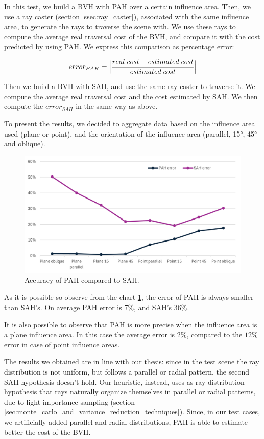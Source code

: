 \documentclass{PoliMi_MasterThesis}
\begin{document}
In this test, we build a BVH with PAH over a certain influence area. Then, we use a ray caster (section \ref{ssec:ray_caster}), associated with the same influence area, to generate the rays to traverse the scene with. We use these rays to compute the average real traversal cost of the BVH, and compare it with the cost predicted by using PAH. We express this comparison as percentage error:

$$error_{PAH} = \Big{|}\frac{real \; cost - estimated \; cost}{estimated \; cost}\Big{|}$$

Then we build a BVH with SAH, and use the same ray caster to traverse it. We compute the average real traversal cost and the cost estimated by SAH. We then compute the $error_{SAH}$ in the same way as above.

To present the results, we decided to aggregate data based on the influence area used (plane or point), and the orientation of the influence area (parallel, 15°, 45° and oblique).

\begin{figure}[H]
	\centering
	\includegraphics[width=\textwidth]{Images/pah_accuracy_chart.png}
	\caption{Accuracy of PAH compared to SAH.} 
	\label{fig:pah_accuracy_chart}
\end{figure}

As it is possible so observe from the chart \ref{fig:pah_accuracy_chart}, the error of PAH is always smaller than SAH's. On average PAH error is $7\%$, and SAH's $36\%$.

It is also possible to observe that PAH is more precise when the influence area is a plane influence area. In this case the average error is $2\%$, compared to the $12\%$ error in case of point influence areas.

The results we obtained are in line with our thesis: since in the test scene the ray distribution is not uniform, but follows a parallel or radial pattern, the second SAH hypothesis doesn't hold. Our heuristic, instead, uses as ray distribution hypothesis that rays naturally organize themselves in parallel or radial patterns, due to light importance sampling (section \ref{sec:monte_carlo_and_variance_reduction_techniques}). Since, in our test cases, we artificially added parallel and radial distributions, PAH is able to estimate better the cost of the BVH.
\end{document}
